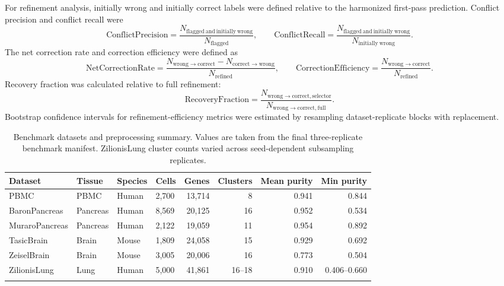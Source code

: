 \documentclass[referee,lineno,pdflatex]{sn-jnl}
\begin{document}
For refinement analysis, initially wrong and initially correct labels were defined relative to the harmonized first-pass prediction. Conflict precision and conflict recall were
\begin{equation}
\mathrm{ConflictPrecision}=\frac{N_{\mathrm{flagged\ and\ initially\ wrong}}}{N_{\mathrm{flagged}}},\qquad
\mathrm{ConflictRecall}=\frac{N_{\mathrm{flagged\ and\ initially\ wrong}}}{N_{\mathrm{initially\ wrong}}}.
\label{eq:conflict-pr}
\end{equation}
The net correction rate and correction efficiency were defined as
\begin{equation}
\mathrm{NetCorrectionRate}=\frac{N_{\mathrm{wrong\to correct}}-N_{\mathrm{correct\to wrong}}}{N_{\mathrm{refined}}},\qquad
\mathrm{CorrectionEfficiency}=\frac{N_{\mathrm{wrong\to correct}}}{N_{\mathrm{refined}}}.
\label{eq:correction-efficiency}
\end{equation}
Recovery fraction was calculated relative to full refinement:
\begin{equation}
\mathrm{RecoveryFraction}=\frac{N_{\mathrm{wrong\to correct, selector}}}{N_{\mathrm{wrong\to correct, full}}}.
\label{eq:recovery-fraction}
\end{equation}
Bootstrap confidence intervals for refinement-efficiency metrics were estimated by resampling dataset-replicate blocks with replacement.

\begin{table}[htp]
\caption{Benchmark datasets and preprocessing summary. Values are taken from the final three-replicate benchmark manifest. ZilionisLung cluster counts varied across seed-dependent subsampling replicates.}\label{tab:datasets}
\begin{tabular}{@{}llllrrrr@{}}
\toprule
Dataset & Tissue & Species & Cells & Genes & Clusters & Mean purity & Min purity\\
\midrule
PBMC & PBMC & Human & 2,700 & 13,714 & 8 & 0.941 & 0.844\\
BaronPancreas & Pancreas & Human & 8,569 & 20,125 & 16 & 0.952 & 0.534\\
MuraroPancreas & Pancreas & Human & 2,122 & 19,059 & 11 & 0.954 & 0.892\\
TasicBrain & Brain & Mouse & 1,809 & 24,058 & 15 & 0.929 & 0.692\\
ZeiselBrain & Brain & Mouse & 3,005 & 20,006 & 16 & 0.773 & 0.504\\
ZilionisLung & Lung & Human & 5,000 & 41,861 & 16--18 & 0.910 & 0.406--0.660\\
\botrule
\end{tabular}
\end{table}
\end{document}
